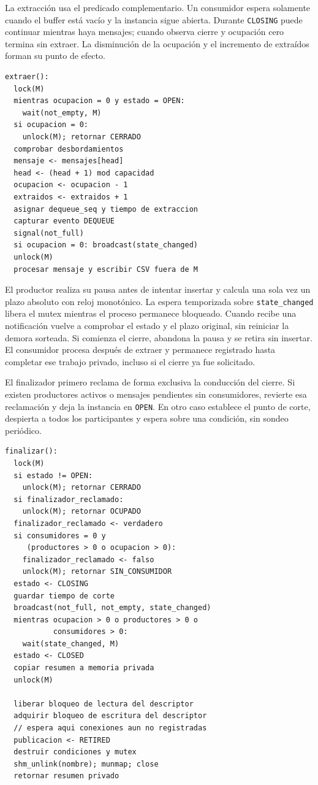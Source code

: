 \documentclass[conference]{IEEEtran}
\begin{document}
La extracción usa el predicado complementario. Un consumidor espera solamente cuando el buffer está vacío y la instancia sigue abierta. Durante \texttt{CLOSING} puede continuar mientras haya mensajes; cuando observa cierre y ocupación cero termina sin extraer. La disminución de la ocupación y el incremento de extraídos forman su punto de efecto.

{\footnotesize
\begin{verbatim}
extraer():
  lock(M)
  mientras ocupacion = 0 y estado = OPEN:
    wait(not_empty, M)
  si ocupacion = 0:
    unlock(M); retornar CERRADO
  comprobar desbordamientos
  mensaje <- mensajes[head]
  head <- (head + 1) mod capacidad
  ocupacion <- ocupacion - 1
  extraidos <- extraidos + 1
  asignar dequeue_seq y tiempo de extraccion
  capturar evento DEQUEUE
  signal(not_full)
  si ocupacion = 0: broadcast(state_changed)
  unlock(M)
  procesar mensaje y escribir CSV fuera de M
\end{verbatim}
}

El productor realiza su pausa antes de intentar insertar y calcula una sola vez un plazo absoluto con reloj monotónico. La espera temporizada sobre \texttt{state\_changed} libera el mutex mientras el proceso permanece bloqueado. Cuando recibe una notificación vuelve a comprobar el estado y el plazo original, sin reiniciar la demora sorteada. Si comienza el cierre, abandona la pausa y se retira sin insertar. El consumidor procesa después de extraer y permanece registrado hasta completar ese trabajo privado, incluso si el cierre ya fue solicitado.

El finalizador primero reclama de forma exclusiva la conducción del cierre. Si existen productores activos o mensajes pendientes sin consumidores, revierte esa reclamación y deja la instancia en \texttt{OPEN}. En otro caso establece el punto de corte, despierta a todos los participantes y espera sobre una condición, sin sondeo periódico.

{\footnotesize
\begin{verbatim}
finalizar():
  lock(M)
  si estado != OPEN:
    unlock(M); retornar CERRADO
  si finalizador_reclamado:
    unlock(M); retornar OCUPADO
  finalizador_reclamado <- verdadero
  si consumidores = 0 y
     (productores > 0 o ocupacion > 0):
    finalizador_reclamado <- falso
    unlock(M); retornar SIN_CONSUMIDOR
  estado <- CLOSING
  guardar tiempo de corte
  broadcast(not_full, not_empty, state_changed)
  mientras ocupacion > 0 o productores > 0 o
           consumidores > 0:
    wait(state_changed, M)
  estado <- CLOSED
  copiar resumen a memoria privada
  unlock(M)

  liberar bloqueo de lectura del descriptor
  adquirir bloqueo de escritura del descriptor
  // espera aqui conexiones aun no registradas
  publicacion <- RETIRED
  destruir condiciones y mutex
  shm_unlink(nombre); munmap; close
  retornar resumen privado
\end{verbatim}
}
\end{document}

